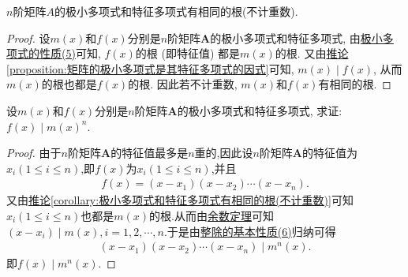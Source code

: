 \documentclass[../../main.tex]{subfiles}%
\begin{document}
\begin{corollary}\label{corollary:极小多项式和特征多项式有相同的根(不计重数)}
$n$阶矩阵$A$的极小多项式和特征多项式有相同的根(不计重数).
\end{corollary}
\begin{proof}

设\(m(x)\)和\(f(x)\)分别是\(n\)阶矩阵\(\boldsymbol{A}\)的极小多项式和特征多项式,
由\hyperref[proposition:极小多项式的性质]{极小多项式的性质(5)}可知, \(f(x)\)的根 (即特征值) 都是\(m(x)\)的根. 又由\hyperref[proposition:矩阵的极小多项式是其特征多项式的因式]{推论\ref{proposition:矩阵的极小多项式是其特征多项式的因式}}可知, \(m(x)\mid f(x)\), 从而\(m(x)\)的根也都是\(f(x)\)的根. 因此若不计重数, \(m(x)\)和\(f(x)\)有相同的根. 

\end{proof}

\begin{example}
设\(m(x)\)和\(f(x)\)分别是\(n\)阶矩阵\(\boldsymbol{A}\)的极小多项式和特征多项式, 求证: \(f(x)\mid m(x)^n\).
\end{example}
\begin{proof}

由于\(n\)阶矩阵\(\boldsymbol{A}\)的特征值最多是\(n\)重的,因此设\(n\)阶矩阵\(\boldsymbol{A}\)的特征值为$x_i(1\leqslant  i\leqslant  n)$,即$f(x)$为$x_i(1\leqslant  i\leqslant  n)$,并且
\begin{align*}
f(x)=(x-x_1)(x-x_2)\cdots(x-x_n).
\end{align*}
又由\hyperref[corollary:极小多项式和特征多项式有相同的根(不计重数)]{推论\ref{corollary:极小多项式和特征多项式有相同的根(不计重数)}}可知$x_i(1\leqslant  i\leqslant  n)$也都是$m(x)$的根.从而由\hyperref[theorem:余数定理]{余数定理}可知$(x-x_i)\mid m(x),i=1,2,\cdots,n$.于是由\hyperref[proposition:整除的基本性质]{整除的基本性质(6)}归纳可得
\begin{align*}
(x-x_1)(x-x_2)\cdots(x-x_n)\mid m^n(x).
\end{align*}
即$f(x)\mid m^n(x)$.

\end{proof}
\end{document}
